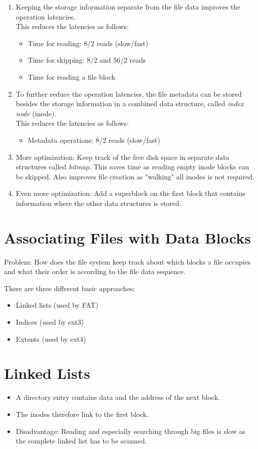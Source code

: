 		\begin{enumerate}
			\item Keeping the storage information separate from the file data improves the operation latencies. \\ This reduces the latencies as follows:
				\begin{itemize}
					\item Time for reading: 8/2 reads (slow/fast)
					\item Time for skipping: 8/2 and 56/2 reads
					\item Time for reading a file block
				\end{itemize}
			\item To further reduce the operation latencies, the file metadata can be stored besides the storage information in a combined data structure, called \textit{index node} (inode). \\ This reduces the latencies as follows:
				\begin{itemize}
					\item Metadata operations: 8/2 reads (slow/fast)
				\end{itemize}
			\item More optimization: Keep track of the free disk space in separate data structures called \textit{bitmap}. This saves time as reading empty inode blocks can be skipped. Also improves file creation as "walking" all inodes is not required.
			\item Even more optimization: Add a superblock on the first block that contains information where the other data structures is stored.
		\end{enumerate}

	\section{Associating Files with Data Blocks}
		Problem: How does the file system keep track about which blocks a file occupies and what their order is according to the file data sequence.

		There are three different basic approaches:
		\begin{itemize}
			\item Linked lists (used by FAT)
			\item Indices (used by ext3)
			\item Extents (used by ext4)
		\end{itemize}

	\section{Linked Lists}
		\begin{itemize}
			\item A directory entry contains data and the address of the next block.
			\item The inodes therefore link to the first block.
			\item Disadvantage: Reading and especially searching through big files is slow as the complete linked list has to be scanned.
		\end{itemize}

